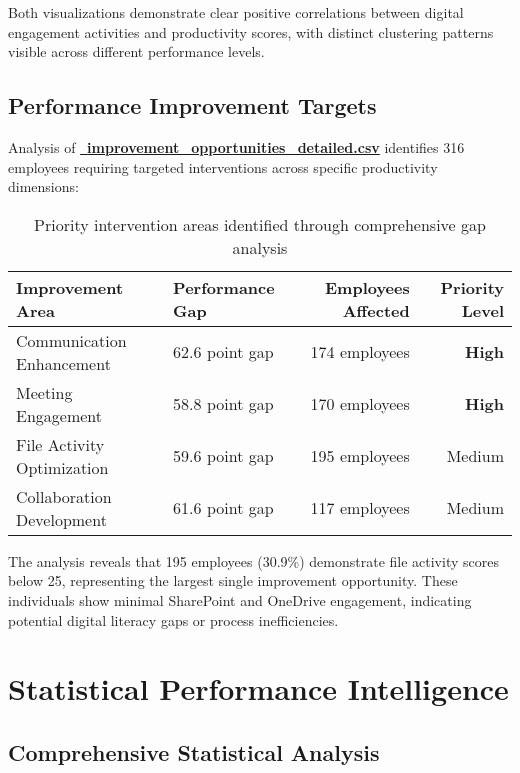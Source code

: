 \documentclass[12pt,a4paper]{article}
\begin{document}
Both visualizations demonstrate clear positive correlations between digital engagement activities and productivity scores, with distinct clustering patterns visible across different performance levels.

\subsection{Performance Improvement Targets}

Analysis of \textcolor{successGreen}{\href{https://fixysaskihumorizijuv.supabase.co/storage/v1/object/public/research-files/03f82764-e85b-4f1f-b127-04cb7347bd2b-improvement_opportunities_detailed.csv?download=}{{\normalsize\faCheckCircle}\, \textbf{improvement\_opportunities\_detailed.csv}}} identifies 316 employees requiring targeted interventions across specific productivity dimensions:

\begin{table}[H]
\centering
\begin{tabularx}{\textwidth}{@{}lXrr@{}}
\toprule
\textbf{\color{primaryBlue}Improvement Area} & \textbf{\color{primaryBlue}Performance Gap} & \textbf{\color{primaryBlue}Employees Affected} & \textbf{\color{primaryBlue}Priority Level} \\
\midrule
Communication Enhancement & 62.6 point gap & 174 employees & \textbf{High} \\
Meeting Engagement & 58.8 point gap & 170 employees & \textbf{High} \\
File Activity Optimization & 59.6 point gap & 195 employees & Medium \\
Collaboration Development & 61.6 point gap & 117 employees & Medium \\
\bottomrule
\end{tabularx}
\caption{Priority intervention areas identified through comprehensive gap analysis}
\end{table}

The analysis reveals that 195 employees (30.9\%) demonstrate file activity scores below 25, representing the largest single improvement opportunity. These individuals show minimal SharePoint and OneDrive engagement, indicating potential digital literacy gaps or process inefficiencies.

\section{Statistical Performance Intelligence}

\subsection{Comprehensive Statistical Analysis}
\end{document}
